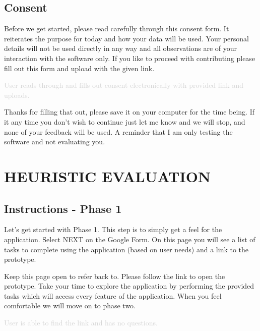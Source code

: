 \documentclass[a4 paper, 10pt]{article}
\begin{document}
    \subsection*{Consent}
        \begin{itshape}
            Before we get started, please read carefully through this consent form. It reiterates the purpose for today and how your data will be used. Your personal details will not be used directly in any way and all observations are of your interaction with the software only. If you like to proceed with contributing please fill out this form and upload with the given link.
        \end{itshape}

        \textcolor{lightgray}
            {User reads through and fills out consent electronically with provided link and uploads.}
        
        \begin{itshape}
            Thanks for filling that out, please save it on your computer for the time being. If it any time you don’t wish to continue just let me know and we will stop, and none of your feedback will be used. A reminder that I am only testing the software and not evaluating you.
        \end{itshape}

\section*{HEURISTIC EVALUATION}
    \subsection*{Instructions - Phase 1}
        \begin{itshape}
            Let's get started with Phase 1. This step is to simply get a feel for the application. Select NEXT on the Google Form. On this page you will see a list of tasks to complete using the application (based on user needs) and a link to the prototype.    

            Keep this page open to refer back to. Please follow the link to open the prototype. Take your time to explore the application by performing the provided tasks which will access every feature of the application. When you feel comfortable we will move on to phase two. 
        \end{itshape}

        \textcolor{lightgray}{User is able to find the link and has no questions.}
\end{document}

